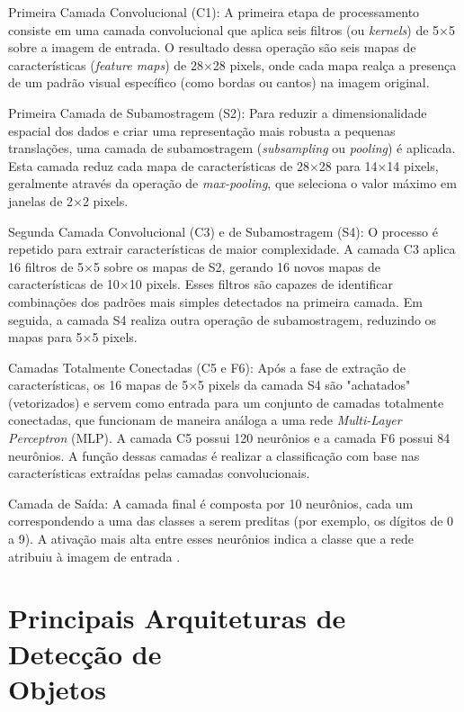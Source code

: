 Primeira Camada Convolucional (C1): A primeira etapa de processamento consiste em uma camada
convolucional que aplica seis filtros (ou \textit{kernels}) de 5×5 sobre a imagem de entrada.
O resultado dessa operação são seis mapas de características (\textit{feature maps}) de 28×28
pixels, onde cada mapa realça a presença de um padrão visual específico (como bordas ou
cantos) na imagem original.

Primeira Camada de Subamostragem (S2): Para reduzir a dimensionalidade espacial dos dados e
criar uma representação mais robusta a pequenas translações, uma camada de subamostragem
(\textit{subsampling} ou \textit{pooling}) é aplicada. Esta camada reduz cada mapa de
características de 28×28 para 14×14 pixels, geralmente através da operação de
\textit{max-pooling}, que seleciona o valor máximo em janelas de 2×2 pixels.

Segunda Camada Convolucional (C3) e de Subamostragem (S4): O processo é repetido para extrair
características de maior complexidade. A camada C3 aplica 16 filtros de 5×5 sobre os mapas de
S2, gerando 16 novos mapas de características de 10×10 pixels. Esses filtros são capazes de
identificar combinações dos padrões mais simples detectados na primeira camada. Em seguida, a
camada S4 realiza outra operação de subamostragem, reduzindo os mapas para 5×5 pixels.

Camadas Totalmente Conectadas (C5 e F6): Após a fase de extração de características, os 16
mapas de 5×5 pixels da camada S4 são "achatados" (vetorizados) e servem como entrada para um
conjunto de camadas totalmente conectadas, que funcionam de maneira análoga a uma rede
\textit{Multi-Layer Perceptron} (MLP). A camada C5 possui 120 neurônios e a camada F6 possui
84 neurônios. A função dessas camadas é realizar a classificação com base nas características
extraídas pelas camadas convolucionais.

Camada de Saída: A camada final é composta por 10 neurônios, cada um correspondendo a uma das
classes a serem preditas (por exemplo, os dígitos de 0 a 9). A ativação mais alta entre esses
neurônios indica a classe que a rede atribuiu à imagem de entrada \cite{lecun1998gradient}.

\section[Principais Arquiteturas de Detecção de Objetos]{Principais Arquiteturas de Detecção de\\Objetos}

